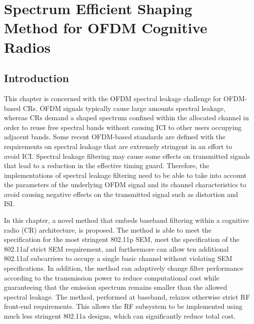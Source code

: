 \chapter{Spectrum Efficient Shaping Method for OFDM Cognitive Radios}
\label{chap:SpectralLeakage}

\section{Introduction}
\label{Sec:Intro}

This chapter is concerned with the OFDM spectral leakage challenge for OFDM-based CRs.
OFDM signals typically cause large amounts spectral leakage, whereas CRs demand a shaped spectrum confined within the allocated channel in order to reuse free spectral bands without causing ICI to other users occupying adjacent bands.
Some recent OFDM-based standards are defined with the requirements on spectral leakage that are extremely stringent in an effort  to avoid ICI.
Spectral leakage filtering may cause some effects on transmitted signals that lead to a reduction in the effective timing guard.
Therefore, the implementations of spectral leakage filtering need to be able to take into account the parameters of the underlying OFDM signal and its channel characteristics to avoid causing negative effects on the transmitted signal such as distortion and ISI.

In this chapter, a novel method that embeds baseband filtering within a cognitive radio (CR) architecture, is proposed.
The method is able to meet the specification for the most stringent 802.11p SEM, meet the specification of the 802.11af strict SEM requirement, and furthermore can allow ten additional 802.11af subcarriers to occupy a single basic channel without violating SEM specifications.
In addition, the method can adaptively change filter performance according to the transmission power to reduce computational cost while guaranteeing that the emission spectrum remains smaller than the allowed spectral leakage.
The method, performed at baseband, relaxes otherwise strict RF front-end requirements.
This allows the RF subsystem to be implemented using much less stringent 802.11a designs, which can significantly reduce total cost.

